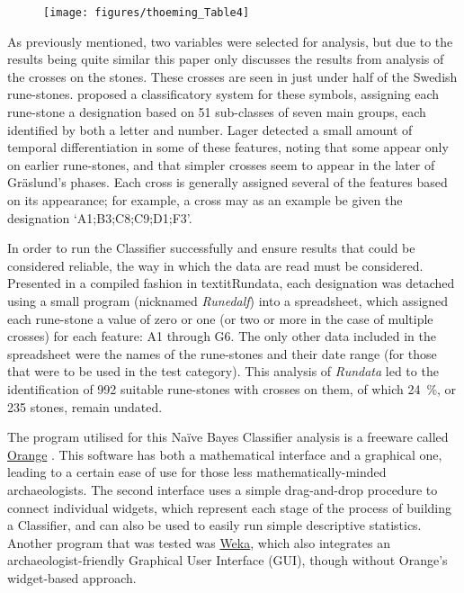 	\begin{figure}[!htb]
		\texttt{[image: figures/thoeming\_Table4]}
		\centering
		\label{fig:Table4}
	\end{figure}

As previously mentioned, two variables were selected for analysis, but due to the results being quite similar this paper only discusses the results from analysis of the crosses on the stones. These crosses are seen in just under half of the Swedish rune-stones. \textcite{Lager_2002} proposed a classificatory system for these symbols, assigning each rune-stone a designation based on 51 sub-classes of seven main groups, each identified by both a letter and number. Lager detected a small amount of temporal differentiation in some of these features, noting that some appear only on earlier rune-stones, and that simpler crosses seem to appear in the later of Gräslund’s phases. Each cross is generally assigned several of the features based on its appearance; for example, a cross may as an example be given the designation ‘A1;B3;C8;C9;D1;F3’. 

In order to run the Classifier successfully and ensure results that could be considered reliable, the way in which the data are read must be considered. Presented in a compiled fashion in textit{Rundata}, each designation was detached using a small program (nicknamed \textit{Runedalf}) into a spreadsheet, which assigned each rune-stone a value of zero or one (or two or more in the case of multiple crosses) for each feature: 
A1 through G6. The only other data included in the spreadsheet were the names of the rune-stones and their date range (for those that were to be used in the test category). This analysis of \textit{Rundata} led to the identification of 992 suitable rune-stones with crosses on them, of which \SI{24}{\percent}, or 235 stones, remain undated. 

The program utilised for this Naïve Bayes Classifier analysis is a freeware called \href{http://orange.biolab.si/}{Orange} \parencite{Demsar_2004}. This software has both a mathematical interface and a graphical one, leading to a certain ease of use for those less mathematically-minded archaeologists. The second interface uses a simple drag-and-drop procedure to connect individual widgets, which represent each stage of the process of building a Classifier, and can also be used to easily run simple descriptive statistics. Another program that was tested was \href{http://www.cs.waikato.ac.nz/ml/weka/}{Weka}, which also integrates an archaeologist-friendly Graphical User Interface (GUI), though without Orange’s widget-based approach.

